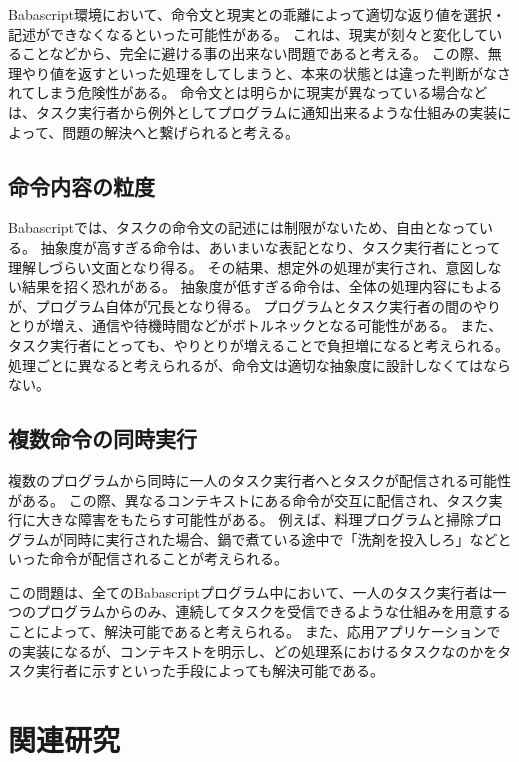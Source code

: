 \documentclass[twoside]{wiss}
\begin{document}
Babascript環境において、命令文と現実との乖離によって適切な返り値を選択・記述ができなくなるといった可能性がある。
これは、現実が刻々と変化していることなどから、完全に避ける事の出来ない問題であると考える。
この際、無理やり値を返すといった処理をしてしまうと、本来の状態とは違った判断がなされてしまう危険性がある。
命令文とは明らかに現実が異なっている場合などは、タスク実行者から例外としてプログラムに通知出来るような仕組みの実装によって、問題の解決へと繋げられると考える。

\subsection{命令内容の粒度}

Babascriptでは、タスクの命令文の記述には制限がないため、自由となっている。
抽象度が高すぎる命令は、あいまいな表記となり、タスク実行者にとって理解しづらい文面となり得る。
その結果、想定外の処理が実行され、意図しない結果を招く恐れがある。
抽象度が低すぎる命令は、全体の処理内容にもよるが、プログラム自体が冗長となり得る。
プログラムとタスク実行者の間のやりとりが増え、通信や待機時間などがボトルネックとなる可能性がある。
また、タスク実行者にとっても、やりとりが増えることで負担増になると考えられる。
処理ごとに異なると考えられるが、命令文は適切な抽象度に設計しなくてはならない。

\subsection{複数命令の同時実行}

複数のプログラムから同時に一人のタスク実行者へとタスクが配信される可能性がある。
この際、異なるコンテキストにある命令が交互に配信され、タスク実行に大きな障害をもたらす可能性がある。
例えば、料理プログラムと掃除プログラムが同時に実行された場合、鍋で煮ている途中で「洗剤を投入しろ」などといった命令が配信されることが考えられる。

この問題は、全てのBabascriptプログラム中において、一人のタスク実行者は一つのプログラムからのみ、連続してタスクを受信できるような仕組みを用意することによって、解決可能であると考えられる。
また、応用アプリケーションでの実装になるが、コンテキストを明示し、どの処理系におけるタスクなのかをタスク実行者に示すといった手段によっても解決可能である。

\section{関連研究}
\end{document}
